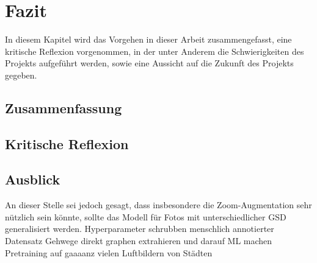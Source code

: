 \chapter{Fazit}

In diesem Kapitel wird das Vorgehen in dieser Arbeit zusammengefasst, eine kritische Reflexion vorgenommen, in der unter Anderem die Schwierigkeiten des Projekts aufgeführt werden, sowie eine Aussicht auf die Zukunft des Projekts gegeben. 

\section{Zusammenfassung}


\section{Kritische Reflexion}


\section{Ausblick}

An dieser Stelle sei jedoch gesagt, dass insbesondere die Zoom-Augmentation sehr nützlich sein könnte, 
sollte das Modell für Fotos mit unterschiedlicher \ac{GSD} generalisiert werden. 
Hyperparameter schrubben
menschlich annotierter Datensatz
Gehwege
direkt graphen extrahieren und darauf ML machen
Pretraining auf gaaaanz vielen Luftbildern von Städten